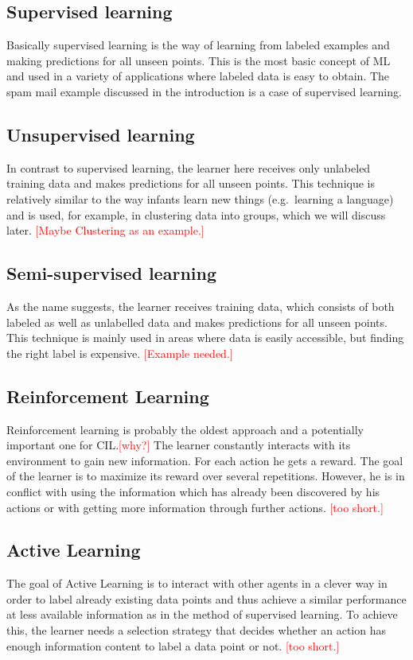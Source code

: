 \documentclass[conference]{IEEEtran}
\newcommand\notes[1]{\textcolor{red}{#1}}
\begin{document}
\subsection{Supervised learning}
Basically supervised learning is the way of learning from labeled examples and making predictions 
for all unseen points. This is the most basic concept of ML and used in a variety of applications 
where labeled data is easy to obtain. The spam mail example discussed in the introduction is a 
case of supervised learning.

\subsection{Unsupervised learning}
In contrast to supervised learning, the learner here receives only 
unlabeled training data and makes predictions for all unseen points. This technique is 
relatively similar to the way infants learn new things (e.g.\ learning a language) and 
is used, for example, in clustering data into groups, which we will discuss later\cite{BrainInf:holzinger}.
\notes{[Maybe Clustering as an example.]}

\subsection{Semi-supervised learning}
As the name suggests, the learner receives training data, which consists of both 
labeled as well as unlabelled data and makes predictions for all unseen points.
This technique is mainly used in areas where data is easily accessible, 
but finding the right label is expensive.
\notes{[Example needed.]}

\subsection{Reinforcement Learning}\label{reinforcement}
Reinforcement learning is probably the oldest approach and a potentially important one for CIL\@.\notes{[why?]} 
The learner constantly interacts with its environment to gain new information. For each action 
he gets a reward. The goal of the learner is to maximize its reward over several repetitions. 
However, he is in conflict with using the information which has already been discovered by his actions 
or with getting more information through further actions.
\notes{[too short.]}

\subsection{Active Learning}\label{active}
The goal of Active Learning is to interact with other agents in a clever way in order 
to label already existing data points and thus achieve a similar performance at less available 
information as in the method of supervised learning. To achieve this, 
the learner needs a selection strategy\cite{ActiveToDedicated:calma} that decides whether 
an action has enough information content to label a data point or not.
\notes{[too short.]}
\end{document}
